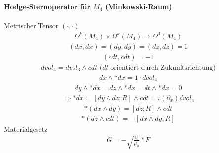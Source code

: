 \documentclass[10pt,a4paper]{article}
\begin{document}
\paragraph{Hodge-Sternoperator für $M_4$ (Minkowski-Raum)} $\,$ \\
Metrischer Tensor $(\cdot , \cdot)$ 
\begin{align}
\Omega^k(M_4) \times \Omega^k(M_4) \longrightarrow \Omega^0 (M_4)
\end{align}
\begin{align}
(dx,dx)=(dy,dy)=(dz,dz)=1
\end{align}
\begin{align}
(cdt,cdt)=-1
\end{align}
\begin{align}
dvol_4= dvol_3 \wedge cdt \text{ ($dt$ orientiert durch Zukunftsrichtung)}
\end{align}
\begin{align}
dx \wedge *dx = 1 \cdot dvol_4
\end{align}
\begin{align}
dy \wedge * dx = dz \wedge *dx = dt \wedge *dx =0 
\end{align}
\begin{align}
\Rightarrow *dx = [dy \wedge dz ;R] \wedge cdt= \iota (\partial_x) dvol_4
\end{align}
\begin{align}
*(dx \wedge dy) = [dz;R] \wedge cdt
\end{align}
\begin{align}
*(dz \wedge cdt) =-[dx \wedge dy ; R]
\end{align}
Materialgesetz
\begin{align}
G= - \sqrt{\frac{\epsilon_0}{\mu_0}} * F
\end{align}
\end{document}
